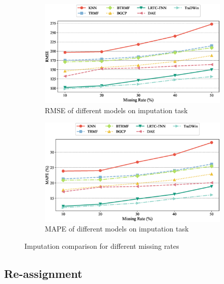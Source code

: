 \begin{figure}[H]
  \centering
  \begin{subfigure}{1\textwidth}
    \includegraphics[width=\linewidth]{rmse_imput.eps}
    \caption{RMSE of different models on imputation task}
    \label{fig:mape_imput}
  \end{subfigure}
  
  \begin{subfigure}{1\textwidth}
    \includegraphics[width=\linewidth]{mape_imput.eps}
    \caption{MAPE of different models on imputation task}
    \label{fig:rmse_imput}
  \end{subfigure}
  \caption{Imputation comparison for different missing rates}
  \label{fig:imput}
\end{figure}

\subsection{Re-assignment}

